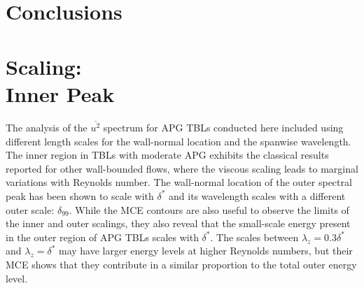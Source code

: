 \section{Conclusions}
\section{\label{sec:InnerPeak} Scaling:\protect\\ Inner Peak }

The analysis of the $\overline{u^2}$ spectrum for APG TBLs conducted here included using different length scales for the wall-normal location and the spanwise wavelength.
The inner region in TBLs with moderate APG exhibits the classical results reported for other wall-bounded flows, where the viscous scaling leads to marginal variations with Reynolds number.
The wall-normal location of the outer spectral peak has been shown to scale with $\delta^*$ and its wavelength scales with a different outer scale: $\delta_{99}$. 
While the MCE contours are also useful to observe the limits of the inner and outer scalings, they also reveal that the small-scale energy present in the outer region of APG TBLs scales with $\delta^*$. The scales between $\lambda_z=0.3\delta^*$ and $\lambda_z=\delta^*$ may have larger energy levels at higher Reynolds numbers, but their MCE shows that they contribute in a similar proportion to the total outer energy level.